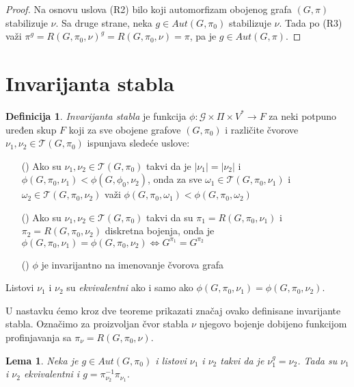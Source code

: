 \documentclass[12pt,oneside]{memoir}
\newtheorem{lemma}{Lema}
\theoremstyle{definition}
\newtheorem*{definition}{Definicija}
\begin{document}
  \begin{proof}
      Na osnovu uslova (R2) bilo koji automorfizam obojenog grafa $(G, \pi)$
      stabilizuje $\nu$. Sa druge strane, neka $g \in Aut(G, \pi_0)$ stabilizuje
      $\nu$. Tada po (R3) važi $\pi^g = R(G, \pi_0, \nu)^g = R(G, \pi_0, \nu) =
      \pi$, pa je $g \in Aut(G, \pi)$.
  \end{proof}

 \section{Invarijanta stabla}

  \begin{definition}
	  \emph{Invarijanta stabla} je funkcija $\phi : \mathcal{G} \times \Pi
	  \times V^* \to F$ za neki potpuno uređen skup $F$ koji za sve obojene
	  grafove $(G, \pi_0)$ i različite čvorove $\nu_1, \nu_2 \in \mathcal{T}(G,
	  \pi_0)$ ispunjava sledeće uslove:

	  \begin{itemize}
		  \item[(\phi1)] Ako su $\nu_1, \nu_2 \in \mathcal{T}(G, \pi_0)$ takvi
			  da je $|\nu_1|=|\nu_2|$ i $\phi(G, \pi_0, \nu_1) < \phi(G,
			  \phi_0, \nu_2)$, onda za sve $\omega_1 \in \mathcal{T}(G, \pi_0,
			  \nu_1)$ i $\omega_2 \in \mathcal{T}(G, \pi_0, \nu_2)$ važi
			  $\phi(G, \pi_0, \omega_1) < \phi(G, \pi_0, \omega_2)$
		  \item[(\phi2)] Ako su $\nu_1, \nu_2 \in \mathcal{T}(G, \pi_0)$ takvi
			  da su $\pi_1 = R(G, \pi_0, \nu_1)$ i $\pi_2 = R(G, \pi_0, \nu_2)$
			  diskretna bojenja, onda je $\phi(G, \pi_0, \nu_1) = \phi(G,
			  \pi_0, \nu_2) \iff G^{\pi_1} = G^{\pi_2}$
		  \item[(\phi3)] $\phi$ je invarijantno na imenovanje čvorova grafa
	  \end{itemize}

	  Listovi $\nu_1$ i $\nu_2$ su \emph{ekvivalentni} ako i samo ako $\phi(G,
	  \pi_0, \nu_1) = \phi(G, \pi_0, \nu_2)$.
  \end{definition}

  U nastavku ćemo kroz dve teoreme prikazati značaj ovako definisane
  invarijante stabla. Označimo za proizvoljan čvor stabla $\nu$ njegovo bojenje
  dobijeno funkcijom profinjavanja sa $\pi_\nu = R(G, \pi_0, \nu)$. 

  \begin{lemma}
	  Neka je $g \in Aut(G, \pi_0)$ i listovi $\nu_1$ i $\nu_2$ takvi da je
	  $\nu_1^g = \nu_2$. Tada su $\nu_1$ i $\nu_2$ ekvivalentni i $g =
	  \pi_{\nu_2}^{-1}\pi_{\nu_1}$.
  \end{lemma}
\end{document}
